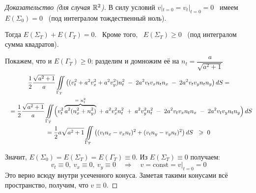 \documentclass[../main.tex]{subfiles}
\begin{document}
\begin{proof}[Доказательство (для случая $\mathbb{R}^2$)]
В силу условий $ v|_{t=0} = v_t|_{t=0} = 0$ \ имеем \ $ E(\Sigma_0)=0 $ \ (под интегралом тождественный ноль).

Тогда $ E(\Sigma_T)+E(\Gamma_T)=0 $. \ 
Кроме того, \ $ E(\Sigma_T)\geq 0 $ \ (под интегралом сумма квадратов).
\vspace{0.5em}

Покажем, что и $ E(\Gamma_T)\geq 0 $: разделим и домножим её на $ n_t=\dfrac{a}{\sqrt{a^2+1}} $
\begin{multline*}
  \frac{1}{2}\frac{\sqrt{a^2+1}}{a}\iint\limits_{\Gamma_T}\roundBr{(v^2_t+a^2v^2_x+a^2v^2_y)n^2_t \; - \; 2a^2v_tv_xn_tn_x \; - \; 2a^2v_tv_yn_tn_y} dS = \\ \shoveleft{
  =\frac{1}{2}\frac{\sqrt{a^2+1}}{a}\iint\limits_{\Gamma_T} \Bigl( v^2_t \overbrace{a^2(n^2_x + n^2_y)}^\text{= $n_t^2$}\; + \; a^2v^2_xn^2_t \; + \; a^2v^2_yn^2_t\; - \; 2a^2v_tv_xn_tn_x \; - \; 2a^2 v_t v_y n_t n_y \Bigr)\, dS }\\
  = \frac{1}{2} a \sqrt{a^2+1} \iint\limits_{\Gamma_T} \roundBr{(v_tn_x -v_xn_t)^2+(v_tn_y-v_yn_t)^2} dS \;\ \geq\ 0  
\end{multline*}

Значит,\; $ E(\Sigma_0)=E(\Sigma_T)=E(\Gamma_T)\equiv 0.$
\; Из $ E(\Sigma_T)\equiv 0 $ получаем: 
$$ v_t\equiv 0,\ v_x\equiv 0,\ v_y\equiv 0 \quad \Rightarrow \quad v = \text{const} = v|_{t=0} = 0 
$$
Это верно всюду внутри усеченного конуса.
Заметая такими конусами всё пространство, получим, что $ v \equiv 0 $.
\end{proof}
\end{document}
